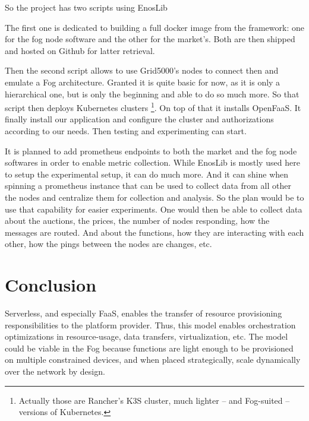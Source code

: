 \documentclass[11pt]{sdm}
\begin{document}
So the project has two scripts using EnosLib

The first one is dedicated to building a full docker image from the framework: one for the fog node software and the other for the market's. Both are then shipped and hosted on Github for latter retrieval.

Then the second script allows to use Grid5000's nodes to connect then and emulate a Fog architecture. Granted it is quite basic for now, as it is only a hierarchical one, but is only the beginning and able to do so much more. So that script then deploys Kubernetes clusters \footnote{Actually those are Rancher's K3S cluster, much lighter – and Fog-suited – versions of Kubernetes. }. On top of that it installs OpenFaaS. It finally install our application and configure the cluster and authorizations according to our needs. Then testing and experimenting can start.

It is planned to add prometheus endpoints to both the market and the fog node softwares in order to enable metric collection. While EnosLib is mostly used here to setup the experimental setup, it can do much more. And it can shine when spinning a prometheus instance that can be used to collect data from all other the nodes and centralize them for collection and analysis. So the plan would be to use that capability for easier experiments. One would then be able to collect data about the auctions, the prices, the number of nodes responding, how the messages are routed. And about the functions, how they are interacting with each other,  how the pings between the nodes are changes, etc.

\fi

\section{Conclusion}

Serverless, and especially \gls{FaaS}, enables the transfer of resource provisioning responsibilities to the platform provider. Thus, this model enables orchestration optimizations in resource-usage, data transfers, virtualization, etc. The model could be viable in the Fog because functions are light enough to be provisioned on multiple constrained devices, and when placed strategically, scale dynamically over the network by design.
\end{document}
